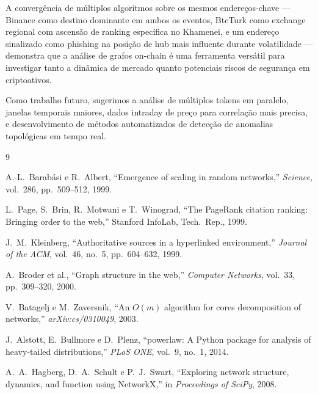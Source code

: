 \documentclass[12pt,a4paper]{article}
\begin{document}
A convergência de múltiplos algoritmos sobre os mesmos endereços-chave --- Binance como destino dominante em ambos os eventos, BtcTurk como exchange regional com ascensão de ranking específica no Khamenei, e um endereço sinalizado como phishing na posição de hub mais influente durante volatilidade --- demonstra que a análise de grafos on-chain é uma ferramenta versátil para investigar tanto a dinâmica de mercado quanto potenciais riscos de segurança em criptoativos.

Como trabalho futuro, sugerimos a análise de múltiplos tokens em paralelo, janelas temporais maiores, dados intraday de preço para correlação mais precisa, e desenvolvimento de métodos automatizados de detecção de anomalias topológicas em tempo real.

\begin{thebibliography}{9}

A.-L.\ Barabási e R.\ Albert, ``Emergence of scaling in random networks,'' \textit{Science}, vol.~286, pp.~509--512, 1999.

L.\ Page, S.\ Brin, R.\ Motwani e T.\ Winograd, ``The PageRank citation ranking: Bringing order to the web,'' Stanford InfoLab, Tech.\ Rep., 1999.

J.\ M.\ Kleinberg, ``Authoritative sources in a hyperlinked environment,'' \textit{Journal of the ACM}, vol.~46, no.~5, pp.~604--632, 1999.

A.\ Broder et al., ``Graph structure in the web,'' \textit{Computer Networks}, vol.~33, pp.~309--320, 2000.

V.\ Batagelj e M.\ Zaversnik, ``An $O(m)$ algorithm for cores decomposition of networks,'' \textit{arXiv:cs/0310049}, 2003.

J.\ Alstott, E.\ Bullmore e D.\ Plenz, ``powerlaw: A Python package for analysis of heavy-tailed distributions,'' \textit{PLoS ONE}, vol.~9, no.~1, 2014.

A.\ A.\ Hagberg, D.\ A.\ Schult e P.\ J.\ Swart, ``Exploring network structure, dynamics, and function using NetworkX,'' in \textit{Proceedings of SciPy}, 2008.

\end{thebibliography}
\end{document}
